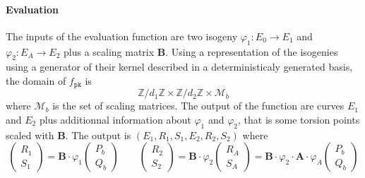 \documentclass[12pt,a4paper]{article}
\begin{document}
		\paragraph{Evaluation} The inputs of the evaluation function are two isogeny
		$\varphi_1:E_0\to E_1$ and $\varphi_2:E_A\to E_2$ plus a scaling matrix $\mathbf B$.
		Using a representation of the isogenies using a generator of their kernel described
		in a deterministicaly generated basis, the domain of $f_\mathtt{pk}$ is
		$$\mathbb{Z}/d_1\mathbb{Z}\times\mathbb{Z}/d_2\mathbb{Z}\times\mathcal M_b$$
		where $\mathcal M_b$ is the set of scaling matrices.
		The output of the function are curves $E_1$ and $E_2$ plus additionnal information
		about $\varphi_1$ and $\varphi_2$, that is some torsion points scaled with $\mathbf B$.
		The output is $(E_1,R_1,S_1,E_2,R_2,S_2)$ where
		\[
			\begin{pmatrix} R_1 \\ S_1 \end{pmatrix} = \mathbf B \cdot \varphi_1 
			\begin{pmatrix} P_b \\ Q_b \end{pmatrix}\quad\quad
			\begin{pmatrix} R_2 \\ S_2 \end{pmatrix} = \mathbf B \cdot\varphi_2
			\begin{pmatrix} R_A \\ S_A \end{pmatrix} = \mathbf B\cdot\varphi_2\cdot\mathbf A
			\cdot\varphi_A \begin{pmatrix} P_b \\ Q_b \end{pmatrix} 
		\] 
\end{document}
